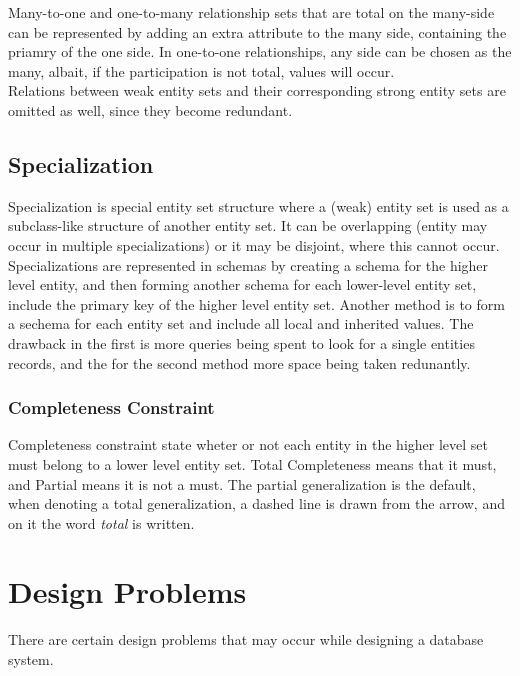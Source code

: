 \documentclass[11pt,a4paper,twocolumn]{book}
\begin{document}
Many-to-one and one-to-many relationship sets that are total on the many-side can be represented by adding an extra attribute to the many side, containing the priamry of the one side. In one-to-one relationships, any side can be chosen as the many, albait, if the participation is not total,  values will occur.\\

Relations between weak entity sets and their corresponding strong entity sets are omitted as well, since they become redundant.

\subsection{Specialization}

Specialization is special entity set structure where a (weak) entity set is used as a subclass-like structure of another entity set. It can be overlapping (entity may occur in multiple specializations) or it may be disjoint, where this cannot occur.\\

Specializations are represented in schemas by creating a schema for the higher level entity, and then forming another schema for each lower-level entity set, include the primary key of the higher level entity set. Another method is to form a sechema for each entity set and include all local and inherited values. The drawback in the first is more queries being spent to look for a single entities records, and the for the second method more space being taken redunantly.\\

\subsubsection{Completeness Constraint}

Completeness constraint state wheter or not each entity in the higher level set must belong to a lower level entity set. Total Completeness means that it must, and Partial means it is not a must. The partial generalization is the default, when denoting a total generalization, a dashed line is drawn from the arrow, and on it the word \textit{total} is written.

\section{Design Problems}

There are certain design problems that may occur while designing a database system.
\end{document}

